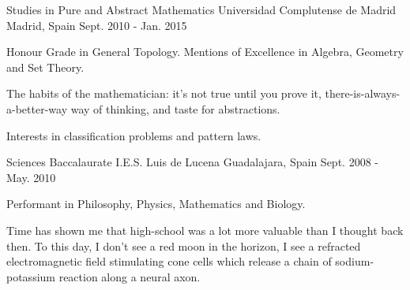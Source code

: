 
\begin{cventries}

\cventry
    {Studies in Pure and Abstract Mathematics} %
    {Universidad Complutense de Madrid} %
    {Madrid, Spain} %
    {Sept. 2010 - Jan. 2015} %
    {
        \begin{cvitems} %
            \item {Honour Grade in General Topology. Mentions of Excellence in Algebra, Geometry and Set Theory.}
            \item {The habits of the mathematician: it's not true until you prove it, there-is-always-a-better-way way of thinking, and taste for abstractions.}
            \item {Interests in classification problems and pattern laws.}
        \end{cvitems}
    }

\cventry
    {Sciences Baccalaurate} %
    {I.E.S. Luis de Lucena} %
    {Guadalajara, Spain} %
    {Sept. 2008 - May. 2010} %
    {
        \begin{cvitems} %
            \item {Performant in Philosophy, Physics, Mathematics and Biology.}
            \item {Time has shown me that high-school was a lot more valuable than I thought back then. To this day, I don't see a red moon in the horizon, I see a refracted electromagnetic field stimulating cone cells which release a chain of sodium-potassium reaction along a neural axon.}
        \end{cvitems}
    }

\end{cventries}
